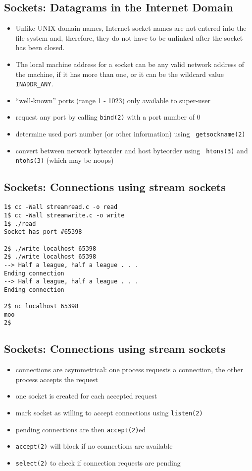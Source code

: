 \documentclass[xga]{xdvislides}
\begin{document}
\subsection{Sockets: Datagrams in the Internet Domain}
\begin{itemize}
	\item Unlike UNIX domain names, Internet socket names are not entered into
		the file system and, therefore, they do not have to be unlinked after the
		socket has been closed.
	\item The local machine address for a socket can be any valid network address
		of the machine, if it has more than one, or it can be the wildcard value
		{\tt INADDR\_ANY}.
	\item ``well-known'' ports (range 1 - 1023) only available to super-user
	\item request any port by calling {\tt bind(2)} with a port number of 0
	\item determine used port number (or other information) using {\tt
		getsockname(2)}
	\item convert between network byteorder and host byteorder using {\tt
		htons(3)} and {\tt ntohs(3)} (which may be noops)
\end{itemize}

\subsection{Sockets: Connections using stream sockets}
\begin{verbatim}
1$ cc -Wall streamread.c -o read
1$ cc -Wall streamwrite.c -o write
1$ ./read
Socket has port #65398

2$ ./write localhost 65398
2$ ./write localhost 65398
--> Half a league, half a league . . .
Ending connection
--> Half a league, half a league . . .
Ending connection

2$ nc localhost 65398
moo
2$
\end{verbatim}
\vfill

\subsection{Sockets: Connections using stream sockets}
\begin{itemize}
	\item connections are asymmetrical:  one process requests a connection,
		the other process accepts the request
	\item one socket is created for each accepted request
	\item mark socket as willing to accept connections using {\tt listen(2)}
	\item pending connections are then {\tt accept(2)}ed
	\item {\tt accept(2)} will block if no connections are available
	\item {\tt select(2)} to check if connection requests are pending
\end{itemize}
\end{document}
